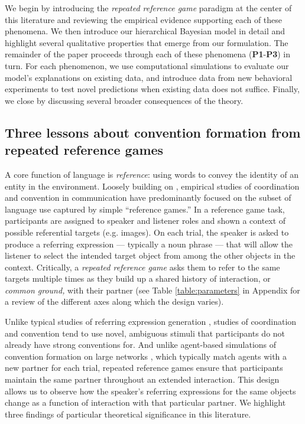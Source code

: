 We begin by introducing the \emph{repeated reference game} paradigm at the center of this literature and reviewing the empirical evidence supporting each of these phenomena.
We then introduce our hierarchical Bayesian model in detail and highlight several qualitative properties that emerge from our formulation.
The remainder of the paper proceeds through each of these phenomena (\textbf{P1}-\textbf{P3}) in turn. 
For each phenomenon, we use computational simulations to evaluate our model's explanations on existing data, and introduce data from new behavioral experiments to test novel predictions when existing data does not suffice.
Finally, we close by discussing several broader consequences of the theory.

\subsection{Three lessons about convention formation from repeated reference games}

A core function of language is \emph{reference}: using words to convey the identity of an entity in the environment. 
Loosely building on , empirical studies of coordination and convention in communication have predominantly focused on the subset of language use captured by simple ``reference games.'' 
In a reference game task, participants are assigned to speaker and listener roles and shown a context  of possible referential targets (e.g. images).
On each trial, the speaker is asked to produce a referring expression --- typically a noun phrase --- that will allow the listener to select the intended target object from among the other objects in the context.
Critically, a \emph{repeated reference game} asks them to refer to the same targets multiple times as they build up a shared history of interaction, or \emph{common ground,} with their partner (see Table \ref{table:parameters} in Appendix for a review of the different axes along which the design varies).

Unlike typical studies of referring expression generation \cite{van_deemter_computational_2016,degen2020redundancy,dale1995computational}, studies of coordination and convention tend to use novel, ambiguous stimuli that participants do not already have strong conventions for.
And unlike agent-based simulations of convention formation on large networks \cite{steels2011modeling,barr_establishing_2004,centola_spontaneous_2015}, which typically match agents with a new partner for each trial, repeated reference games ensure that participants maintain the same partner throughout an extended interaction.
This design allows us to observe how the speaker's referring expressions for the same objects change as a function of interaction with that particular partner.
We highlight three findings of particular theoretical significance in this literature.

